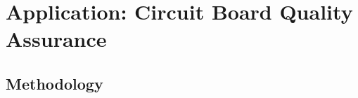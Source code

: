 \documentclass[a4paper,12pt]{article}
\begin{document}
\newpage

\section{Application: Circuit Board Quality Assurance}



\subsection{Methodology}

    
    
\end{document}
